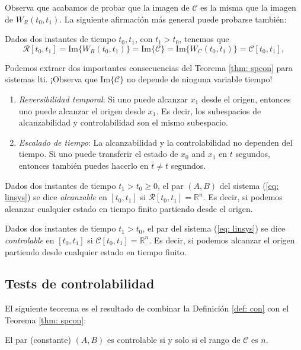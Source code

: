 Observa que acabamos de probar que la imagen de $\mathcal{C}$ es la misma que la imagen de $W_R(t_0,t_1)$. La siguiente afirmación más general puede probarse también:
\begin{theorem}
	\label{thm: spcon}
Dados dos instantes de tiempo $t_0, t_1$, con $t_1 > t_0$, tenemos que
	\begin{equation}
		\mathcal{R}[t_0,t_1] = \text{Im}\{W_R(t_0,t_1)\} = \text{Im}\{\mathcal{C}\} = \text{Im}\{W_C(t_0,t_1)\} = \mathcal{C}[t_0,t_1],
	\end{equation}
\end{theorem}

Podemos extraer dos importantes consecuencias del Teorema \ref{thm: spcon} para sistemas lti. ¡Observa que $\text{Im}\{\mathcal{C}\}$ no depende de ninguna variable tiempo!

\begin{enumerate}
	\item \emph{Reversibilidad temporal}: Si uno puede alcanzar $x_1$ desde el origen, entonces uno puede alcanzar el origen desde $x_1$. Es decir, los subespacios de alcanzabilidad y controlabilidad son el mismo subespacio.
	\item \emph{Escalado de tiempo}: La alcanzabilidad y la controlabilidad no dependen del tiempo. Si uno puede transferir el estado de $x_0$ and $x_1$ en $t$ segundos, entonces también puedes hacerlo en $\bar t \neq t$ segundos.
\end{enumerate}

\begin{definition}
	Dados dos instantes de tiempo $t_1 > t_0 \geq 0$, el par $(A,B)$ del sistema (\ref{eq: linsys}) se dice \emph{alcanzable} en $[t_0, t_1]$ si $\mathcal{R}[t_0,t_1] = \mathbb{R}^n$. Es decir, si podemos alcanzar cualquier estado en tiempo finito partiendo desde el origen.
\end{definition}

\begin{definition}
	\label{def: con}
	Dados dos instantes de tiempo $t_1 > t_0$, el par del sistema (\ref{eq: linsys}) se dice \emph{controlable} en $[t_0, t_1]$ si $\mathcal{C}[t_0,t_1] = \mathbb{R}^n$. Es decir, si podemos alcanzar el origen partiendo desde cualquier estado en tiempo finito.
\end{definition}

\subsection{Tests de controlabilidad}
El siguiente teorema es el resultado de combinar la Definición \ref{def: con} con el Teorema \ref{thm: spcon}:
\begin{theorem}
	El par (constante) $(A,B)$ es controlable si y solo si el rango de $\mathcal{C}$ es $n$.
\end{theorem}


